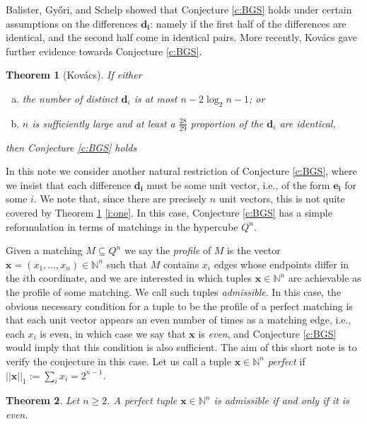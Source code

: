 \documentclass{article}
\newtheorem{theorem}{Theorem}[section]
\begin{document}
Balister, Gy{\H{o}}ri, and Schelp \cite{BGS11} showed that Conjecture \ref{c:BGS} holds under certain assumptions on the differences $\bm{d_i}$: namely if the first half of the differences are identical, and the second half come in identical pairs. More recently, Kov{\'a}cs \cite{K23,K23a} gave further evidence towards Conjecture \ref{c:BGS}.
\begin{theorem}[Kov{\'a}cs]\label{t:kovacs}
If either
\begin{enumerate}[(a)]
    \item\label{i:one} the number of distinct $\bm{d}_i$ is at most $n-2\log_2 n -1$; or
    \item\label{i:two} $n$ is sufficiently large and at least a $\frac{28}{29}$ proportion of the $\bm{d}_i$ are identical,
\end{enumerate}
then Conjecture \ref{c:BGS} holds
\end{theorem}

In this note we consider another natural restriction of Conjecture \ref{c:BGS}, where we insist that each difference $\bm{d_i}$ must be some unit vector, i.e., of the form $\bm{e_i}$ for some $i$. We note that, since there are precisely $n$ unit vectors, this is not quite covered by Theorem \ref{t:kovacs} \eqref{i:one}. In this case, Conjecture \ref{c:BGS} has a simple reformulation in terms of matchings in the hypercube $Q^n$.

Given a matching $M \subseteq Q^n$ we say the \emph{profile} of $M$ is the vector $\bm{x}=(x_1,\ldots, x_n) \in \mathbb{N}^n$ such that $M$ contains $x_i$ edges whose endpoints differ in the $i$th coordinate, and we are interested in which tuples $\bm{x} \in \mathbb{N}^n$ are achievable as the profile of some matching. We call such tuples \emph{admissible}. In this case, the obvious necessary condition for a tuple to be the profile of a perfect matching is that each unit vector appears an even number of times as a matching edge, i.e., each $x_i$ is even, in which case we say that $\bm{x}$ is \emph{even}, and Conjecture \ref{c:BGS} would imply that this condition is also sufficient. The aim of this short note is to verify the conjecture in this case. Let us call a tuple $\bm{x} \in \mathbb{N}^n$  \emph{perfect} if $||\bm{x}||_1 := \sum_i x_i = 2^{n-1}$.

\begin{theorem}\label{t:perfect}
Let $n \geq 2$. A perfect tuple $\bm{x} \in \mathbb{N}^n$ is admissible if and only if it is even.
\end{theorem}
\end{document}
